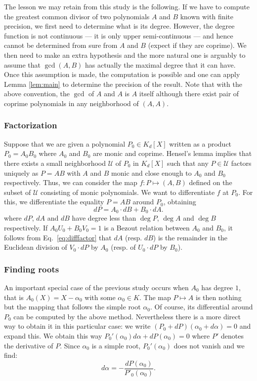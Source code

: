 \documentclass{lms}
\begin{document}
\medskip

The lesson we may retain from this study is the following. If we have to 
compute the greatest common divisor of two polynomials $A$ and $B$ known 
with finite precision, we first need to determine what is its degree. 
However, the degree function is not continuous --- it is only upper 
semi-continuous --- and hence cannot be determined from sure from $A$ and 
$B$ (expect if they are coprime). We then need to make an extra 
hypothesis and the more natural one is arguably to assume that 
$\gcd(A,B)$ has actually the maximal degree that it can have. Once this
assumption is made, the computation is possible and one can apply Lemma 
\ref{lem:main} to determine the precision of the result.
Note that with the above convention, the $\gcd$ of $A$ and $A$ is $A$ 
itself although there exist pair of coprime polynomials in any 
neighborhood of $(A,A)$.

\subsubsection*{Factorization}

Suppose that we are given a polynomial $P_0 \in K_d[X]$ written as a 
product $P_0 = A_0 B_0$ where $A_0$ and $B_0$ are monic and coprime. 
Hensel's lemma implies that there exists a small neighborhood $\mathcal 
U$ of $P_0$ in $K_d[X]$ such that any $P \in \mathcal U$ factors 
uniquely as $P = A B$ with $A$ and $B$ monic and close enough to $A_0$ 
and $B_0$ respectively. Thus, we can consider the map $f : P 
\mapsto (A,B)$ defined on the subset of $\mathcal U$ consisting of monic 
polynomials. We want to differentiate $f$ at $P_0$. For this, we 
differentiate the equality $P = A B$ around $P_0$, obtaining
\begin{equation}
\label{eq:difffactor}
dP = A_0 \cdot dB + B_0 \cdot dA.
\end{equation}
where $dP$, $dA$ and $dB$ have degree less than $\deg P$, $\deg A$ and 
$\deg B$ respectively. If $A_0 U_0 + B_0 V_0 = 1$ is a Bezout relation
between $A_0$ and $B_0$, it follows from Eq.~\eqref{eq:difffactor} that
$dA$ (resp. $dB$) is the remainder in the Euclidean division of $V_0
{\cdot} dP$ by $A_0$ (resp. of $U_0 {\cdot} dP$ by $B_0$).

\subsubsection*{Finding roots}

An important special case of the previous study occurs when $A_0$ has 
degree $1$, that is $A_0(X) = X - \alpha_0$ with some $\alpha_0 \in K$. 
The map $P \mapsto A$ is then nothing but the mapping that 
follows the simple root $\alpha_0$. Of course, its differential around 
$P_0$ can be computed by the above method. Nevertheless there is a more 
direct way to obtain it in this particular case: we write $(P_0 + 
dP)(\alpha_0 + d\alpha) = 0$ and expand this. We obtain this way 
$P_0'(\alpha_0) d\alpha + dP(\alpha_0) = 0$ where $P'$ denotes the 
derivative of $P$. Since $\alpha_0$ is a simple root, $P_0'(\alpha_0)$ 
does not vanish and we find:
$$d \alpha = - \frac{dP(\alpha_0)}{P'_0(\alpha_0)}.$$
\end{document}
